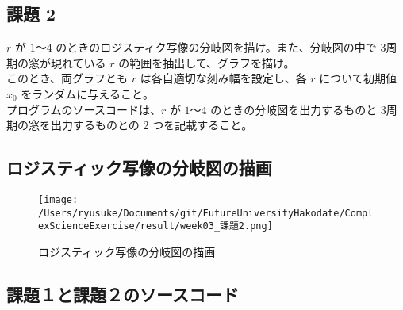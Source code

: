 \documentclass[dvipdfmx,uplatex]{jsarticle}
\begin{document}
\newpage

\subsection{課題 2}
  $r$ が $1$～$4$ のときのロジスティク写像の分岐図を描け。また、分岐図の中で 3周期の窓が現れている $r$ の範囲を抽出して、グラフを描け。\\
このとき、両グラフとも $r$ は各自適切な刻み幅を設定し、各 $r$ について初期値 $x_{0}$ をランダムに与えること。\\
プログラムのソースコードは、$r$ が $1$～$4$ のときの分岐図を出力するものと 3周期の窓を出力するものとの 2 つを記載すること。\\

\subsection{ロジスティック写像の分岐図の描画}
\begin{figure}[htbp]
\begin{center}
\texttt{[image: /Users/ryusuke/Documents/git/FutureUniversityHakodate/ComplexScienceExercise/result/week03\_課題2.png]}
\caption{ロジスティック写像の分岐図の描画}
\end{center}
\end{figure}

\newpage

\subsection{課題１と課題２のソースコード}
\end{document}
